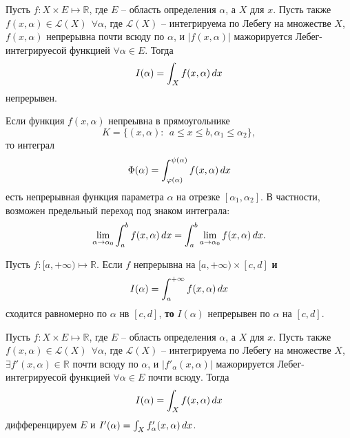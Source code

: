 \begin{to_thr}
    Пусть $f \colon  X \times  E \mapsto \mathbb{R}$, где $E$ -- область определения $\alpha$, а $X$ для $x$. Пусть также $f(x, \alpha) \in \mathcal L (X) \ \ \forall \alpha$, где $\mathcal L(X)$ -- интегрируема по Лебегу на множестве $X$, $f(x, \alpha)$ непрерывна почти всюду по $\alpha$, и $|f(x, \alpha)|$ мажорируется Лебег-интегрируесой функцией $\forall \alpha \in E$. Тогда 
    \begin{equation*}
        I(\alpha) = \int_X f(x, \alpha) \, d x
    \end{equation*}
    непрерывен.
\end{to_thr}

\begin{to_con}
    Если функция $f(x, \alpha)$ непреывна в прямоугольнике
    \begin{equation*}
        K = \{(x, \alpha): \ \ a \leq x \leq b, \alpha_1 \leq \alpha_2\},
    \end{equation*}
    то интеграл
    \begin{equation*}
        \Phi (\alpha) = \int_{\varphi(\alpha)}^{\psi (\alpha)} f(x, \alpha) \, d x
    \end{equation*}
    есть непрерывная функция параметра $\alpha$ на отрезке $[\alpha_1, \alpha_2]$. В частности, возможен предельный переход под знаком интеграла:
    \begin{equation*}
        \lim_{\alpha \to \alpha_0} \int_a^b f(x, \alpha) \, d x = \int_a^b \lim_{a \to \alpha_0} f(x, \alpha) \, d x.
    \end{equation*}
\end{to_con}

\begin{to_con}
    Пусть $f \colon  [a, + \infty) \mapsto \mathbb{R}$. Если $f$ непрерывна на $[a, + \infty) \times  [c, d]$ \textbf{и} 
    \begin{equation*}
        I(\alpha) = \int_a^{+\infty} f(x, \alpha) \, d x
    \end{equation*}
    сходится равномерно по $\alpha$ нв $[c, d]$, \textbf{то} $I(\alpha)$ непрерывен по $\alpha$ на $[c, d]$. 
\end{to_con}

\begin{to_thr}[]
    Пусть $f \colon  X \times  E \mapsto \mathbb{R}$, где $E$ -- область определения $\alpha$, а $X$ для $x$. Пусть также $f(x, \alpha) \in \mathcal L (X) \ \ \forall \alpha$, где $\mathcal L(X)$ -- интегрируема по Лебегу на множестве $X$, $\exists f'(x, \alpha) \in \mathbb{R}$ почти всюду по $\alpha$, и $|f'_{\alpha}(x, \alpha)|$ мажорируется Лебег-интегрируесой функцией $\forall \alpha \in E$ почти всюду. Тогда 
    \begin{equation*}
        I(\alpha) = \int_X f(x, \alpha) \, d x
    \end{equation*}
    дифференцируем $E$ и $I' (\alpha) = \int_X f'_\alpha (x, \alpha) \, d x$.
\end{to_thr}

